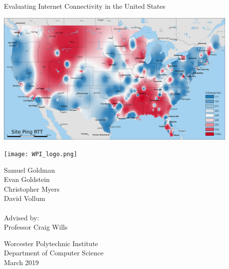 \noindent\begin{minipage}{0.1\textwidth}
\end{minipage}
\begin{minipage}{0.9\textwidth}
    \begin{center}
        \Huge\noindent Evaluating Internet Connectivity in the United States
        
        \vspace{1.5in}
        \includegraphics[width=0.9\textwidth]{images/siteping/site_ping_rtt_idw.png}
    \end{center}
    \vspace{1in}
    \begin{minipage}{\textwidth}    
        \begin{flushright}
            \texttt{[image: WPI\_logo.png]} 
        \end{flushright}
    \end{minipage}
    \noindent\begin{minipage}{0.5\textwidth}
        \small
        Samuel Goldman \\
        Evan Goldstein \\
        Christopher Myers \\
        David Vollum \\ \\
        Advised by: \\
        Professor Craig Wills
    \end{minipage}
    \begin{minipage}{0.5\textwidth}
        \begin{flushright}
            \small
            Worcester Polytechnic Institute \\
            Department of Computer Science\\
            March 2019
        \end{flushright}
    \end{minipage}
\end{minipage}